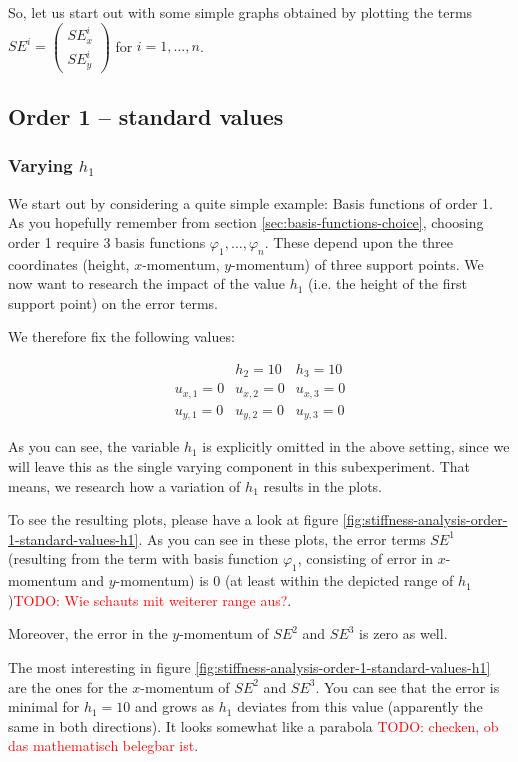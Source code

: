 \documentclass{article}
\newcommand{\todo}[1]{\textcolor{red}{TODO: #1}}
\renewcommand{\phi}{\varphi}
\begin{document}
So, let us start out with some simple graphs obtained by plotting the terms $SE^i =
\begin{pmatrix}
  SE_x^i \\ SE_y^i
\end{pmatrix}$ for $i=1,\dots, n$.

\subsection{Order 1 -- standard values}

\subsubsection{Varying $h_1$}

We start out by considering a quite simple example: Basis functions of order 1. As you hopefully remember from section \ref{sec:basis-functions-choice}, choosing order 1 require 3 basis functions $\phi_1,\dots,\phi_n$. These depend upon the three coordinates (height, $x$-momentum, $y$-momentum) of three support points. We now want to research the impact of the value $h_1$ (i.e. the height of the first support point) on the error terms.

We therefore fix the following values:

\begin{eqnarray*}
  & h_2 = 10 & h_3 = 10 \\
  u_{x,1} = 0 & u_{x,2} = 0 & u_{x,3} = 0 \\
  u_{y,1} = 0 & u_{y,2} = 0 & u_{y,3} = 0
\end{eqnarray*}

As you can see, the variable $h_1$ is explicitly omitted in the above setting, since we will leave this as the single varying component in this subexperiment. That means, we research how a variation of $h_1$ results in the plots.



To see the resulting plots, please have a look at figure \ref{fig:stiffness-analysis-order-1-standard-values-h1}. As you can see in these plots, the error terms $SE^1$ (resulting from the term with basis function $\phi_1$, consisting of error in $x$-momentum and $y$-momentum) is 0 (at least within the depicted range of $h_1$)\todo{Wie schauts mit weiterer range aus?}.

Moreover, the error in the $y$-momentum of $SE^2$ and $SE^3$ is zero as well.

The most interesting in figure \ref{fig:stiffness-analysis-order-1-standard-values-h1} are the ones for the $x$-momentum of $SE^2$ and $SE^3$. You can see that the error is minimal for $h_1=10$ and grows as $h_1$ deviates from this value (apparently the same in both directions). It looks somewhat like a parabola \todo{checken, ob das mathematisch belegbar ist}.
\end{document}
